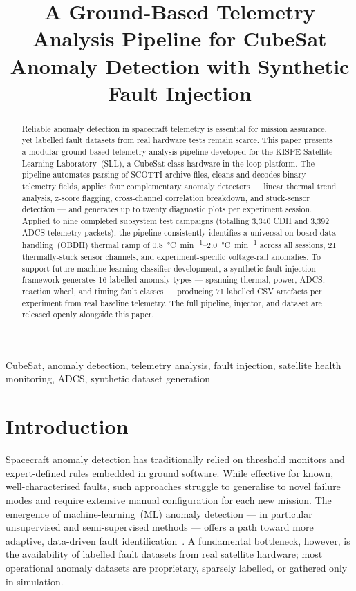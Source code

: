 \documentclass[conference]{IEEEtran}
\title{A Ground-Based Telemetry Analysis Pipeline for CubeSat
       Anomaly Detection with Synthetic Fault Injection}
\author{
  \IEEEauthorblockN{Logan Luna}
  \IEEEauthorblockA{
    \textit{KISPE Space Systems / University Collaboration}\\
    loganluna@example.com
  }
}
\begin{document}
\maketitle

\begin{abstract}
Reliable anomaly detection in spacecraft telemetry is essential for
mission assurance, yet labelled fault datasets from real hardware
tests remain scarce.  This paper presents a modular ground-based
telemetry analysis pipeline developed for the KISPE Satellite
Learning Laboratory~(SLL), a CubeSat-class hardware-in-the-loop
platform.  The pipeline automates parsing of SCOTTI archive files,
cleans and decodes binary telemetry fields, applies four complementary
anomaly detectors — linear thermal trend analysis, z-score flagging,
cross-channel correlation breakdown, and stuck-sensor detection —
and generates up to twenty diagnostic plots per experiment session.
Applied to nine completed subsystem test campaigns (totalling 3{,}340
CDH and 3{,}392 ADCS telemetry packets), the pipeline consistently
identifies a universal on-board data handling~(OBDH) thermal ramp of
\SIrange{0.8}{2.0}{\celsius\per\minute} across all sessions, 21
thermally-stuck sensor channels, and experiment-specific
voltage-rail anomalies.  To support future machine-learning
classifier development, a synthetic fault injection framework
generates 16 labelled anomaly types — spanning thermal, power, ADCS,
reaction wheel, and timing fault classes — producing 71 labelled CSV
artefacts per experiment from real baseline telemetry.  The full
pipeline, injector, and dataset are released openly alongside this
paper.
\end{abstract}

\begin{IEEEkeywords}
CubeSat, anomaly detection, telemetry analysis, fault injection,
satellite health monitoring, ADCS, synthetic dataset generation
\end{IEEEkeywords}

\section{Introduction}

Spacecraft anomaly detection has traditionally relied on threshold
monitors and expert-defined rules embedded in ground software.
While effective for known, well-characterised faults, such approaches
struggle to generalise to novel failure modes and require extensive
manual configuration for each new mission.  The emergence of
machine-learning~(ML) anomaly detection — in particular unsupervised
and semi-supervised methods — offers a path toward more adaptive,
data-driven fault identification~\cite{hundman2018detecting,
kerner2020comparison}.  A fundamental bottleneck, however, is the
availability of labelled fault datasets from real satellite hardware;
most operational anomaly datasets are proprietary, sparsely
labelled, or gathered only in simulation.
\end{document}
